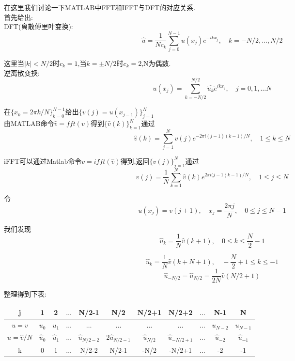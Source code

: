 \documentclass[12pt]{article}
\begin{document}
\begin{CJK}{UTF8}{gkai}
    在这里我们讨论一下MATLAB中FFT和IFFT与DFT的对应关系.\\
    
    首先给出:\\
    
    DFT(离散傅里叶变换):\\
    
   $$ \hat{u}=\dfrac{1}{Nc_{k}}\sum_{j=0}^{N-1}u(x_j)e^{-ikx_j},\quad k=-N/2,\dots,N/2$$
   
   这里当$|k|< N/2$时$c_k=1$,当$k=\pm N/2$时$c_k=2$,N为偶数.\\
   
    逆离散变换:\\
  
  $$u(x_j)=\sum_{k=-N/2}^{N/2} \hat{u_k}e^{ikx_j},\quad j=0,1,\dots N$$
  
  在$\{x_k=2\pi k /N\}_{k=0}^{N-1}$给出$\{v(j)=u(x_{j-1})\}_{j=1}^{N}$\\
  
 由MATLAB命令$ \hat{v}=fft(v)$得到$\{\hat{v}(k)\}_{k=1}^N$通过\\
 
 $$\hat{v}(k)=\sum_{j=1}^{N}v(j)e^{-2\pi i(j-1)(k-1)/N},\quad 1\leq k \leq N$$
 
 iFFT可以通过Matlab命令$v=ifft(\hat  {v})$得到,返回$\{v(j)\}_{j=1}^N$通过\\
 
 $$v(j)=\dfrac{1}{N}\sum_{k=1}^{N}\hat{v}(k)e^{2\pi i(j-1(k-1)/N}, \quad 1\leq j\leq N$$
 
 令\\
 
 $$u(x_j)=v(j+1),\quad x_j=\dfrac{2\pi j}{N},\quad 0\leq j \leq N-1$$
 
 我们发现\\
 
 $$ \hat{u}_k=\dfrac{1}{N}\hat{v}(k+1), \quad 0\leq k \leq \dfrac{N}{2}-1$$
 
 $$ \hat{u}_k=\dfrac{1}{N}\hat{v}(k+N+1), \quad -\dfrac{N}{2}+1\leq k \leq-1$$
 $$ \hat{u}_{-N/2}=\hat{u}_{N/2} = \dfrac{1}{2N}\hat{v}(N/2+1)$$
 
 整理得到下表:\\
 
\begin{table}[H]
	\centering
	\begin{tabular}{ccccccccccc}
		
		\toprule
		j&1& 2  &$\dots$&N/2-1&N/2&N/2+1&N/2+2&$\dots$&N-1&N\\
		\midrule    
       $u=v$&$u_0$&$u_1$&$\dots$&$\dots$&$\dots$&$\dots$&$\dots$&$\dots$&$u_{N-2}$&$u_{N-1}$\\
       $\hat{u}=\hat{v}/N$&$\hat{u}_0$&$\hat{u}_1$&$\dots$&$\hat{u}_{N/2-2}$&$2\hat{u}_{N/2-1}$&$\hat{u}_{N/2}$&$\hat{u}_{-N/2+1}$&$\dots$&$\hat{u}_{-2}$&$\hat{u}_{-1}$\\
       k&0&1&$\dots$&N/2-2&N/2-1&-N/2&-N/2+1&$\dots$&-2&-1\\
		\bottomrule
	\end{tabular}
\end{table} 


\end{CJK}
\end{document}

